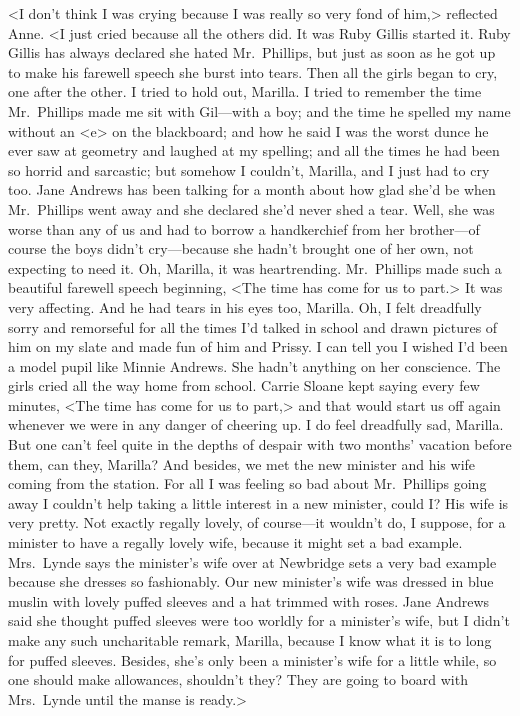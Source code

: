 <I don't think I was crying because I was really so very fond of him,> reflected Anne. <I just cried because all the others did. It was Ruby Gillis started it. Ruby Gillis has always declared she hated Mr.~Phillips, but just as soon as he got up to make his farewell speech she burst into tears. Then all the girls began to cry, one after the other. I tried to hold out, Marilla. I tried to remember the time Mr.~Phillips made me sit with Gil—with a boy; and the time he spelled my name without an <e> on the blackboard; and how he said I was the worst dunce he ever saw at geometry and laughed at my spelling; and all the times he had been so horrid and sarcastic; but somehow I couldn't, Marilla, and I just had to cry too. Jane Andrews has been talking for a month about how glad she'd be when Mr.~Phillips went away and she declared she'd never shed a tear. Well, she was worse than any of us and had to borrow a handkerchief from her brother—of course the boys didn't cry—because she hadn't brought one of her own, not expecting to need it. Oh, Marilla, it was heartrending. Mr.~Phillips made such a beautiful farewell speech beginning, <The time has come for us to part.> It was very affecting. And he had tears in his eyes too, Marilla. Oh, I felt dreadfully sorry and remorseful for all the times I'd talked in school and drawn pictures of him on my slate and made fun of him and Prissy. I can tell you I wished I'd been a model pupil like Minnie Andrews. She hadn't anything on her conscience. The girls cried all the way home from school. Carrie Sloane kept saying every few minutes, <The time has come for us to part,> and that would start us off again whenever we were in any danger of cheering up. I do feel dreadfully sad, Marilla. But one can't feel quite in the depths of despair with two months' vacation before them, can they, Marilla? And besides, we met the new minister and his wife coming from the station. For all I was feeling so bad about Mr.~Phillips going away I couldn't help taking a little interest in a new minister, could I\@? His wife is very pretty. Not exactly regally lovely, of course—it wouldn't do, I suppose, for a minister to have a regally lovely wife, because it might set a bad example. Mrs.~Lynde says the minister's wife over at Newbridge sets a very bad example because she dresses so fashionably. Our new minister's wife was dressed in blue muslin with lovely puffed sleeves and a hat trimmed with roses. Jane Andrews said she thought puffed sleeves were too worldly for a minister's wife, but I didn't make any such uncharitable remark, Marilla, because I know what it is to long for puffed sleeves. Besides, she's only been a minister's wife for a little while, so one should make allowances, shouldn't they? They are going to board with Mrs.~Lynde until the manse is ready.>

